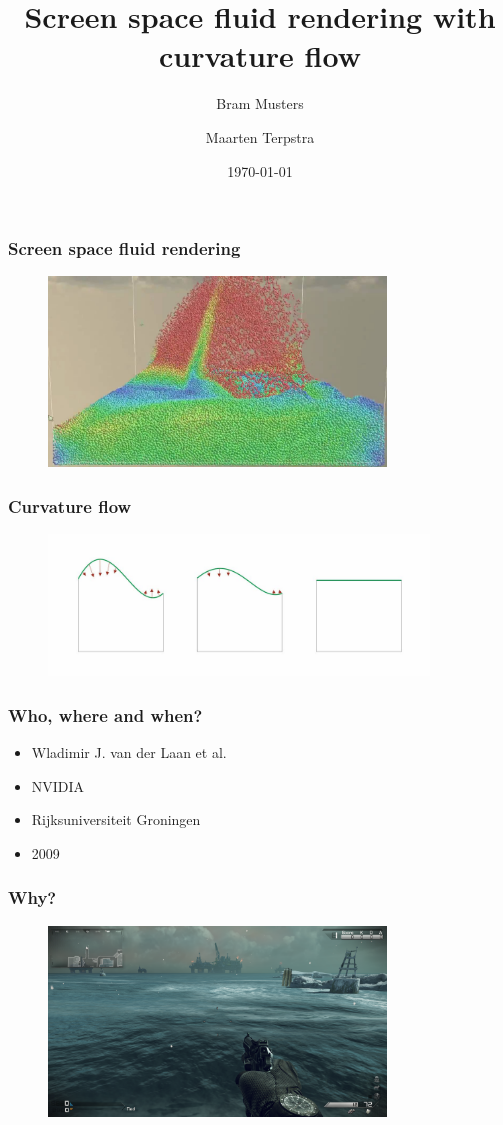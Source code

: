 \documentclass{beamer}
\title[Fluid rendering with curvature flow] %
{Screen space fluid rendering with curvature flow}
\author[Musters, Terpstra] %
{Bram Musters \and Maarten Terpstra}
\date{\today}
\begin{document}
	\frame{\titlepage}
	\begin{frame}[t]\frametitle{Screen space fluid rendering}
		\begin{figure}
			\includegraphics[width=0.8\textwidth]{sph.jpg}
		\end{figure}
	\end{frame}
	\begin{frame}[t]\frametitle{Curvature flow}
		\begin{figure}
			\centering
			\includegraphics[width=0.9\textwidth]{curvatureflow.jpg}
		\end{figure}
	\end{frame}
	\begin{frame}[t]\frametitle{Who, where and when?}
	    \begin{itemize}
	    	\item Wladimir J. van der Laan et al.
	    	\item NVIDIA 
	    	\item Rijksuniversiteit Groningen
	    	\item 2009
	    \end{itemize}
	\end{frame}
	\begin{frame}[t]\frametitle{Why?}
		\begin{figure}
			\centering
			\includegraphics[width=0.8\textwidth]{cod.png}
		\end{figure}
	\end{frame}
\end{document}
